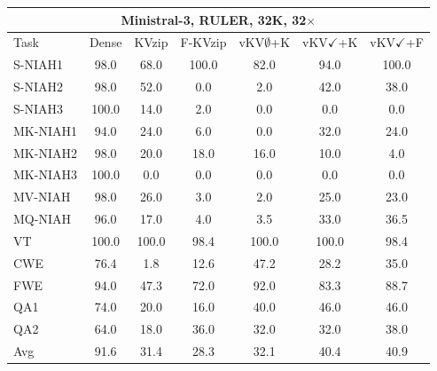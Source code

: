 \begin{tabular}{lcccccc}
\toprule
\multicolumn{7}{c}{Ministral-3, RULER, 32K, 32$\times$} \\
\midrule
Task & Dense & KVzip & F-KVzip & vKV$\emptyset$+K & vKV$\checkmark$+K & vKV$\checkmark$+F \\
\midrule
S-NIAH1 & 98.0 & 68.0 & 100.0 & 82.0 & 94.0 & 100.0 \\
S-NIAH2 & 98.0 & 52.0 & 0.0 & 2.0 & 42.0 & 38.0 \\
S-NIAH3 & 100.0 & 14.0 & 2.0 & 0.0 & 0.0 & 0.0 \\
MK-NIAH1 & 94.0 & 24.0 & 6.0 & 0.0 & 32.0 & 24.0 \\
MK-NIAH2 & 98.0 & 20.0 & 18.0 & 16.0 & 10.0 & 4.0 \\
MK-NIAH3 & 100.0 & 0.0 & 0.0 & 0.0 & 0.0 & 0.0 \\
MV-NIAH & 98.0 & 26.0 & 3.0 & 2.0 & 25.0 & 23.0 \\
MQ-NIAH & 96.0 & 17.0 & 4.0 & 3.5 & 33.0 & 36.5 \\
VT & 100.0 & 100.0 & 98.4 & 100.0 & 100.0 & 98.4 \\
CWE & 76.4 & 1.8 & 12.6 & 47.2 & 28.2 & 35.0 \\
FWE & 94.0 & 47.3 & 72.0 & 92.0 & 83.3 & 88.7 \\
QA1 & 74.0 & 20.0 & 16.0 & 40.0 & 46.0 & 46.0 \\
QA2 & 64.0 & 18.0 & 36.0 & 32.0 & 32.0 & 38.0 \\
\midrule
Avg & 91.6 & 31.4 & 28.3 & 32.1 & 40.4 & 40.9 \\
\bottomrule
\end{tabular}
\vspace{0.8em}

